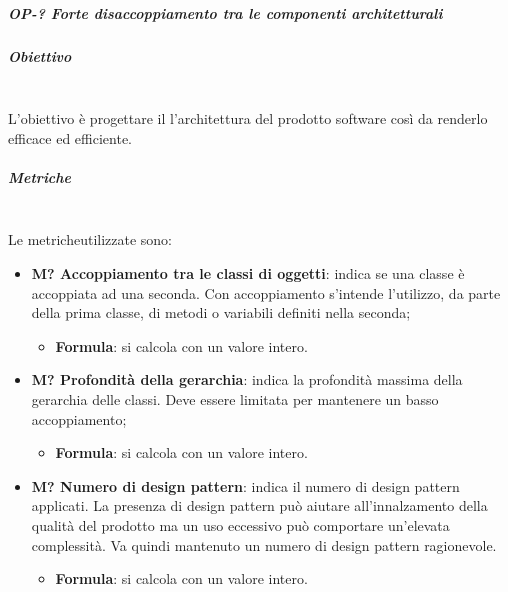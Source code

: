 			\subparagraph{OP-? Forte disaccoppiamento tra le componenti architetturali}
			\subparagraph*{Obiettivo}\mbox{}\\ [1mm]
			L'obiettivo è progettare il l'architettura del prodotto software così da renderlo efficace ed efficiente.
			\subparagraph*{Metriche}\mbox{}\\ [1mm]
			Le metriche\glosp utilizzate sono:
			\begin{itemize}
				\item \textbf{M? Accoppiamento tra le classi di oggetti}: indica se una classe è accoppiata ad una seconda. Con accoppiamento s'intende l'utilizzo, da parte della prima classe, di metodi o variabili definiti nella seconda; 
				\begin{itemize}
					\item[] \textbf{Formula}: si calcola con un valore intero.
				\end{itemize}
				\item \textbf{M? Profondità della gerarchia}: indica la profondità massima della gerarchia delle classi. Deve essere limitata per mantenere un basso accoppiamento;
				\begin{itemize}
					\item[] \textbf{Formula}: si calcola con un valore intero.
				\end{itemize} 	
				\item \textbf{M? Numero di design pattern}: indica il numero di design pattern applicati. La presenza di design pattern può aiutare all'innalzamento della qualità del prodotto ma un uso eccessivo può comportare un'elevata complessità. Va quindi mantenuto un numero di design pattern ragionevole.
				\begin{itemize}
					\item[] \textbf{Formula}: si calcola con un valore intero.
				\end{itemize} 	
			\end{itemize}
		
